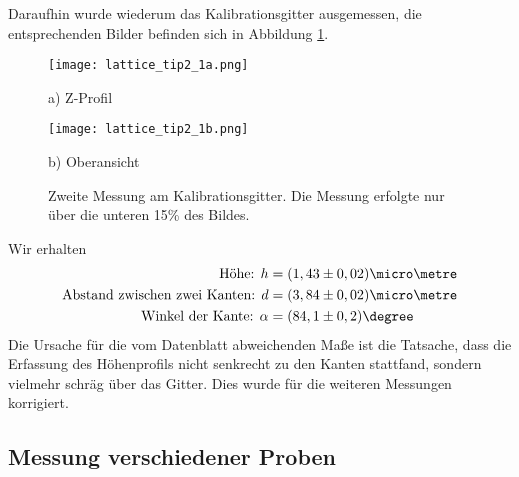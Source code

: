 Daraufhin wurde wiederum das Kalibrationsgitter ausgemessen, die entsprechenden Bilder befinden sich in Abbildung \ref{fig:Lattice3}.
\begin{figure}[h]
\centering
	\begin{minipage}{0.45\textwidth}
	\centering
		\texttt{[image: lattice\_tip2\_1a.png]}
		\caption*{a) Z-Profil}
	\end{minipage}
	\hfill
	\begin{minipage}{0.45\textwidth}
	\centering
		\texttt{[image: lattice\_tip2\_1b.png]}
		\caption*{b) Oberansicht}
	\end{minipage}
	\caption[Zweite Messung am Kalibrationsgitter]{Zweite Messung am Kalibrationsgitter. Die Messung erfolgte nur über die unteren 15\% des Bildes.}
	\label{fig:Lattice3}
\end{figure}
Wir erhalten
\begin{align*}
\text{Höhe: }h&=(1,43\pm 0,02)\micro\metre\\
\text{Abstand zwischen zwei Kanten: }d&=(3,84 \pm 0,02)\micro\metre\\
\text{Winkel der Kante: }\alpha&=(84,1\pm 0,2)\degree
\end{align*}
Die Ursache für die vom Datenblatt abweichenden Maße ist die Tatsache, dass die Erfassung des Höhenprofils nicht senkrecht zu den Kanten stattfand, sondern vielmehr schräg über das Gitter. Dies wurde für die weiteren Messungen korrigiert.
\subsection{Messung verschiedener Proben}
